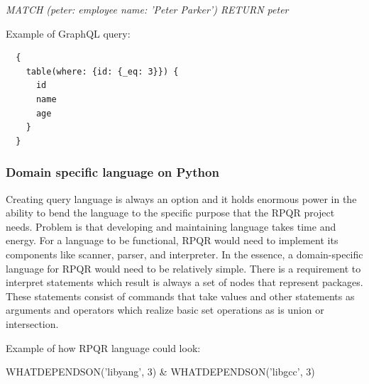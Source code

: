 \textit{MATCH (peter: employee {name: 'Peter Parker'}) RETURN peter}

Example of GraphQL query:

\begin{lstlisting}
  {
    table(where: {id: {_eq: 3}}) {
      id
      name
      age
    }
  }
\end{lstlisting}

\subsubsection*{Domain specific language on Python}
Creating query language is always an option and it holds enormous power in the ability to
bend the language to the specific purpose that the RPQR project needs. Problem is that developing
and maintaining language takes time and energy. For a language to be functional, RPQR would
need to implement its components like scanner, parser, and interpreter. In the essence,
a domain-specific language for RPQR would need to be relatively simple. There is a requirement
to interpret statements which result is always a set of nodes that represent packages. These
statements consist of commands that take values and other statements as arguments and operators
which realize basic set operations as is union or intersection.

Example of how RPQR language could look:

WHATDEPENDSON('libyang', 3) \& WHATDEPENDSON('libgcc', 3)

\newpage

